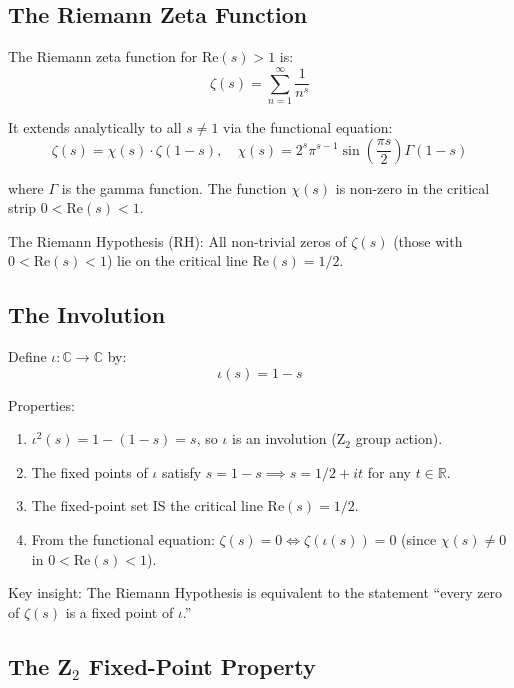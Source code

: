 \documentclass[11pt]{article}
\begin{document}
\subsection{The Riemann Zeta Function}

The Riemann zeta function for $\mathrm{Re}(s) > 1$ is:
$$\zeta(s) = \sum_{n=1}^{\infty} \frac{1}{n^s}$$

It extends analytically to all $s \neq 1$ via the functional equation:
\begin{equation}\label{eq:functional}
\zeta(s) = \chi(s) \cdot \zeta(1-s), \quad \chi(s) = 2^s \pi^{s-1} \sin\left(\frac{\pi s}{2}\right) \Gamma(1-s)
\end{equation}

where $\Gamma$ is the gamma function. The function $\chi(s)$ is non-zero in the critical strip $0 < \mathrm{Re}(s) < 1$.

The Riemann Hypothesis (RH): All non-trivial zeros of $\zeta(s)$ (those with $0 < \mathrm{Re}(s) < 1$) lie on the critical line $\mathrm{Re}(s) = 1/2$.

\subsection{The Involution}

Define $\iota: \mathbb{C} \to \mathbb{C}$ by:
\begin{equation}
\iota(s) = 1 - s
\end{equation}

Properties:
\begin{enumerate}[nosep]
\item $\iota^2(s) = 1 - (1 - s) = s$, so $\iota$ is an involution (Z$_2$ group action).
\item The fixed points of $\iota$ satisfy $s = 1 - s \implies s = 1/2 + it$ for any $t \in \mathbb{R}$.
\item The fixed-point set IS the critical line $\mathrm{Re}(s) = 1/2$.
\item From the functional equation: $\zeta(s) = 0 \iff \zeta(\iota(s)) = 0$ (since $\chi(s) \neq 0$ in $0 < \mathrm{Re}(s) < 1$).
\end{enumerate}

Key insight: The Riemann Hypothesis is equivalent to the statement ``every zero of $\zeta(s)$ is a fixed point of $\iota$.''

\subsection{The Z$_2$ Fixed-Point Property}
\end{document}
